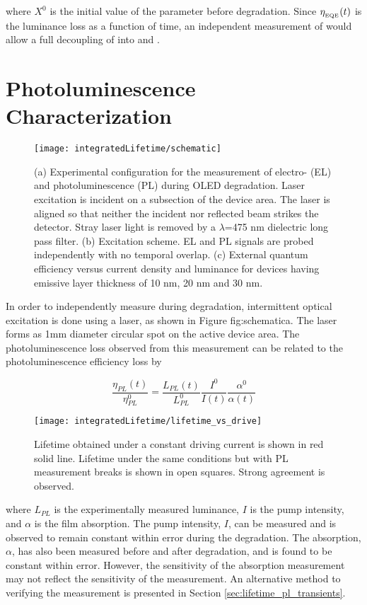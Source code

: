 \documentclass[../thesis.tex]{subfiles}
\begin{document}
where $X^0$ is the initial value of the parameter before degradation.
Since $\eta_{_\text{\tiny EQE}}(t)$ is the luminance loss as a function of time, an independent measurement of \pl would allow a full decoupling of \eqe into \pl and \ef.

\section{Photoluminescence Characterization}
\begin{figure}[ht]
\centering
\texttt{[image: integratedLifetime/schematic]}
\caption{(a) Experimental configuration for the measurement of electro- (EL) and photoluminescence (PL) during OLED degradation.  Laser excitation is incident on a subsection of the device area.  The laser is aligned so that neither the incident nor reflected beam strikes the detector.  Stray laser light is removed by a $\lambda$=475 nm dielectric long pass filter.  (b) Excitation scheme.  EL and PL signals are probed independently with no temporal overlap.  (c) External quantum efficiency versus current density and luminance for devices having emissive layer thickness of 10 nm, 20 nm and 30 nm.}
\label{fig:schematic}
\end{figure}

In order to independently measure \pl during degradation, intermittent optical excitation is done using a laser, as shown in Figure {fig:schematic}a.
The laser forms as 1mm diameter circular spot on the active device area.
The photoluminescence loss observed from this measurement can be related to the photoluminescence efficiency loss by

\begin{equation}
\frac{\eta_{PL}(t)}{\eta_{PL}^0}=\frac{L_{PL}(t)}{L_{PL}^0}\frac{I^0}{I(t)}\frac{\alpha^0}{\alpha(t)}
\label{eqn:pl_decay}
\end{equation}

\begin{wrapfigure}{r}{.5\textwidth}
\centering
\texttt{[image: integratedLifetime/lifetime\_vs\_drive]}
\caption{Lifetime obtained under a constant driving current is shown in red solid line.  Lifetime under the same conditions but with PL measurement breaks is shown in open squares.  Strong agreement is observed.}
\label{fig:lifetime_vs_drive}
\end{wrapfigure}

where $L_{PL}$ is the experimentally measured luminance, $I$ is the pump intensity, and $\alpha$ is the film absorption.
The pump intensity, $I$, can be measured and is observed to remain constant within error during the degradation.
The absorption, $\alpha$, has also been measured before and after degradation, and is found to be constant within error.
However, the sensitivity of the absorption measurement may not reflect the sensitivity of the \pl measurement.
An alternative method to verifying the \pl measurement is presented in Section \ref{sec:lifetime_pl_transients}.
\end{document}
